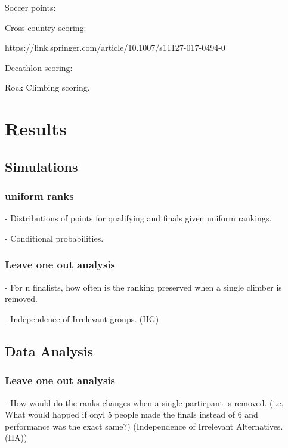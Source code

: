 \documentclass{article}\usepackage[]{graphicx}\usepackage[]{color}
\begin{document}



Soccer points: %

Cross country scoring: %

https://link.springer.com/article/10.1007/s11127-017-0494-0 \cite{BoudreauEtAl2018}

Decathlon scoring: %

Rock Climbing scoring.  

\section{Results}

\subsection{Simulations}
\subsubsection{uniform ranks}

 - Distributions of points for qualifying and finals given uniform rankings. 
 
 - Conditional probabilities.  
 
 \subsubsection{Leave one out analysis} 
 
 - For n finalists, how often is the ranking preserved when a single climber is removed.
 
 - Independence of Irrelevant groups.  (IIG)
 
\subsection{Data Analysis} 
\subsubsection{Leave one out analysis} 

 - How would do the ranks changes when a single particpant is removed.  (i.e. What would happed if onyl 5 people made the finals instead of 6 and performance was the exact same?) (Independence of Irrelevant Alternatives.  (IIA))
 
\end{document}
